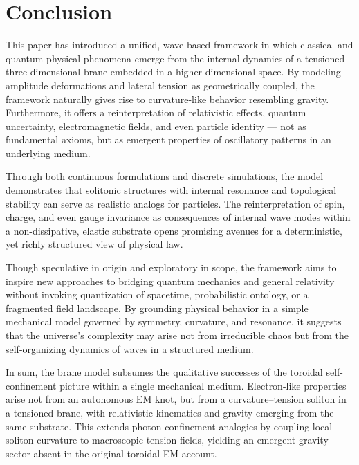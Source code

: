 \section{Conclusion}\label{conclusion}

This paper has introduced a unified, wave-based framework in which
classical and quantum physical phenomena emerge from the internal
dynamics of a tensioned three-dimensional brane embedded in a
higher-dimensional space. By modeling amplitude deformations and lateral
tension as geometrically coupled, the framework naturally gives rise to
curvature-like behavior resembling gravity. Furthermore, it offers a
reinterpretation of relativistic effects, quantum uncertainty,
electromagnetic fields, and even particle identity --- not as
fundamental axioms, but as emergent properties of oscillatory patterns
in an underlying medium.

Through both continuous formulations and discrete simulations, the model
demonstrates that solitonic structures with internal resonance and
topological stability can serve as realistic analogs for particles. The
reinterpretation of spin, charge, and even gauge invariance as
consequences of internal wave modes within a non-dissipative, elastic
substrate opens promising avenues for a deterministic, yet richly
structured view of physical law.

Though speculative in origin and exploratory in scope, the framework
aims to inspire new approaches to bridging quantum mechanics and general
relativity without invoking quantization of spacetime, probabilistic
ontology, or a fragmented field landscape. By grounding physical
behavior in a simple mechanical model governed by symmetry, curvature,
and resonance, it suggests that the universe's complexity may arise not
from irreducible chaos but from the self-organizing dynamics of waves in
a structured medium.

In sum, the brane model subsumes the qualitative successes of the toroidal self-confinement
picture within a single mechanical medium. Electron-like properties arise not from an autonomous
EM knot, but from a curvature–tension soliton in a tensioned brane, with relativistic kinematics
and gravity emerging from the same substrate. This extends photon-confinement analogies by
coupling local soliton curvature to macroscopic tension fields, yielding an emergent-gravity
sector absent in the original toroidal EM account.